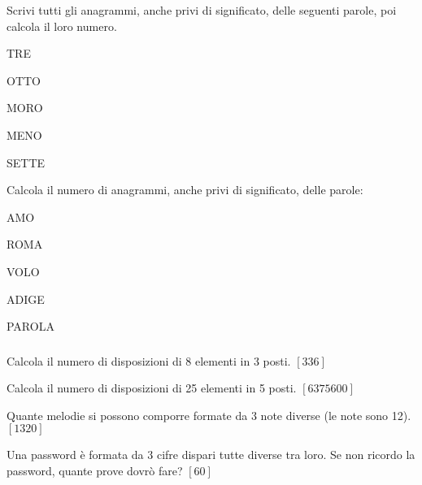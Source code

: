 \begin{esercizio}\label{P.3}
Scrivi tutti gli anagrammi, anche privi di significato, delle seguenti 
parole, poi calcola il loro numero.
\begin{multicols}{5}
 \begin{enumeratea}
  \item TRE
  \item OTTO
  \item MORO
  \item MENO
  \item SETTE
 \end{enumeratea}
 \end{multicols}
\end{esercizio}

\begin{esercizio}\label{P.3}
Calcola il numero di anagrammi, anche privi di significato, delle parole:
\begin{multicols}{5}
 \begin{enumeratea}
  \item AMO
  \item ROMA
  \item VOLO
  \item ADIGE
  \item PAROLA
 \end{enumeratea}
 \end{multicols}
\end{esercizio}

\subsubsection*{}

\begin{esercizio}\label{D.1}
Calcola il numero di disposizioni di 8 elementi in 3 posti.
\hfill \(\left[336\right]\)
\end{esercizio}

\begin{esercizio}\label{D.2}
Calcola il numero di disposizioni di 25 elementi in 5 posti.
\hfill \(\left[6375600\right]\)
\end{esercizio}

\begin{esercizio}\label{D.3}
Quante melodie si possono comporre formate da 3 note diverse (le note sono 12).
\hfill \(\left[1320\right]\)
\end{esercizio}

\begin{esercizio}\label{D.4}
Una password è formata da 3 cifre dispari tutte diverse tra loro. Se non ricordo la password, quante prove dovrò fare?
\hfill \(\left[60\right]\)
\end{esercizio}

